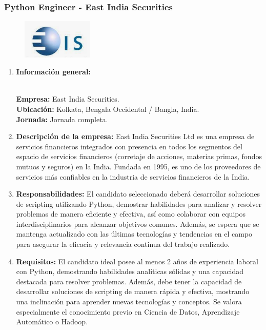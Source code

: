 \documentclass[12pt]{article}
\begin{document}
            \subsubsection{Python Engineer - East India Securities}

                \begin{figure}[!h]
                    \centering
                    \includegraphics[width=0.3\textwidth]{Recursos/Img/EastIndianLogo.png}
                \end{figure}

                \begin{enumerate}
                    \item \textbf{Información general:}
                    
                        \textbf{\\Empresa:} East India Securities.
                        \textbf{\\Ubicación:} Kolkata, Bengala Occidental / Bangla, India.
                        \textbf{\\Jornada:} Jornada completa.

                    \item \textbf{Descripción de la empresa:}
                        East India Securities Ltd es una empresa de servicios financieros integrados con presencia en todos los segmentos del espacio de servicios financieros (corretaje de acciones, materias primas, fondos mutuos y seguros) en la India. Fundada en 1995, es uno de los proveedores de servicios más confiables en la industria de servicios financieros de la India.

                    \item \textbf{Responsabilidades:}
                        El candidato seleccionado deberá desarrollar soluciones de scripting utilizando Python, demostrar habilidades para analizar y resolver problemas de manera eficiente y efectiva, así como colaborar con equipos interdisciplinarios para alcanzar objetivos comunes. Además, se espera que se mantenga actualizado con las últimas tecnologías y tendencias en el campo para asegurar la eficacia y relevancia continua del trabajo realizado.

                    \item \textbf{Requisitos:}
                        El candidato ideal posee al menos 2 años de experiencia laboral con Python, demostrando habilidades analíticas sólidas y una capacidad destacada para resolver problemas. Además, debe tener la capacidad de desarrollar soluciones de scripting de manera rápida y efectiva, mostrando una inclinación para aprender nuevas tecnologías y conceptos. Se valora especialmente el conocimiento previo en Ciencia de Datos, Aprendizaje Automático o Hadoop.

                \end{enumerate}
            \newpage
\end{document}
